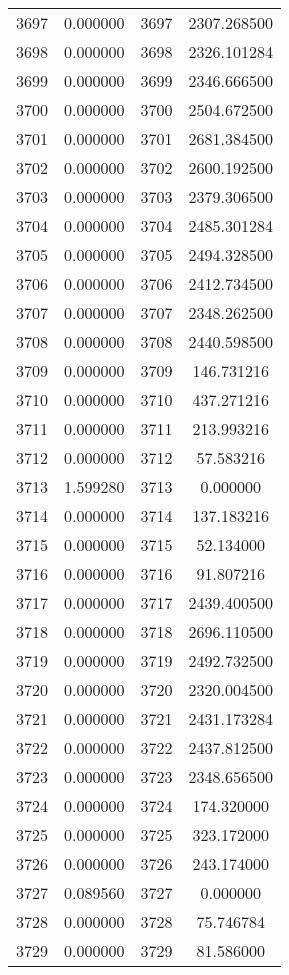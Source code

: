 \documentclass[12pt]{article}
\begin{document}
\begin{longtable}{@{}cccc@{}}
3697 & 0.000000 & 3697 & 2307.268500 \\
3698 & 0.000000 & 3698 & 2326.101284 \\
3699 & 0.000000 & 3699 & 2346.666500 \\
3700 & 0.000000 & 3700 & 2504.672500 \\
3701 & 0.000000 & 3701 & 2681.384500 \\
3702 & 0.000000 & 3702 & 2600.192500 \\
3703 & 0.000000 & 3703 & 2379.306500 \\
3704 & 0.000000 & 3704 & 2485.301284 \\
3705 & 0.000000 & 3705 & 2494.328500 \\
3706 & 0.000000 & 3706 & 2412.734500 \\
3707 & 0.000000 & 3707 & 2348.262500 \\
3708 & 0.000000 & 3708 & 2440.598500 \\
3709 & 0.000000 & 3709 & 146.731216 \\
3710 & 0.000000 & 3710 & 437.271216 \\
3711 & 0.000000 & 3711 & 213.993216 \\
3712 & 0.000000 & 3712 & 57.583216 \\
3713 & 1.599280 & 3713 & 0.000000 \\
3714 & 0.000000 & 3714 & 137.183216 \\
3715 & 0.000000 & 3715 & 52.134000 \\
3716 & 0.000000 & 3716 & 91.807216 \\
3717 & 0.000000 & 3717 & 2439.400500 \\
3718 & 0.000000 & 3718 & 2696.110500 \\
3719 & 0.000000 & 3719 & 2492.732500 \\
3720 & 0.000000 & 3720 & 2320.004500 \\
3721 & 0.000000 & 3721 & 2431.173284 \\
3722 & 0.000000 & 3722 & 2437.812500 \\
3723 & 0.000000 & 3723 & 2348.656500 \\
3724 & 0.000000 & 3724 & 174.320000 \\
3725 & 0.000000 & 3725 & 323.172000 \\
3726 & 0.000000 & 3726 & 243.174000 \\
3727 & 0.089560 & 3727 & 0.000000 \\
3728 & 0.000000 & 3728 & 75.746784 \\
3729 & 0.000000 & 3729 & 81.586000 \\

\end{longtable}
\end{document}

